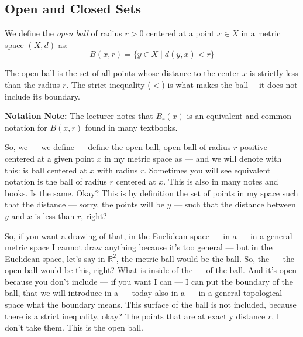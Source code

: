 \subsection{Open and Closed Sets}

\begin{math-stroke}
\setcounter{theorem}{37}
\begin{definition}\label{def:open-ball}
We define the \emph{open ball} of radius $r > 0$ centered at a point $x \in X$ in a metric space $(X, d)$ as:
\[ B(x, r) = \{ y \in X \mid d(y, x) < r \} \]
\end{definition}

\begin{explanation-of-steps}
The open ball is the set of all points whose distance to the center $x$ is strictly less than the radius $r$. The strict inequality ($<$) is what makes the ball —it does not include its boundary.
\end{explanation-of-steps}

\textbf{Notation Note:} The lecturer notes that $B_r(x)$ is an equivalent and common notation for $B(x, r)$ found in many textbooks.
\end{math-stroke}

\begin{spoken-clean}[00:03:13 - 00:05:12]
So, we --- we define --- define the open ball, open ball of radius $r$ positive centered at a given point $x$ in my metric space as --- and we will denote with this: is ball centered at $x$ with radius $r$. Sometimes you will see equivalent notation is the ball of radius $r$ centered at $x$. This is also in many notes and books. Is the same. Okay? This is by definition the set of points in my space such that the distance --- sorry, the points will be $y$ --- such that the distance between $y$ and $x$ is less than $r$, right?

So, if you want a drawing of that, in the Euclidean space --- in a --- in a general metric space I cannot draw anything because it's too general --- but in the Euclidean space, let's say in $\mathbb{R}^2$, the metric ball would be the ball. So, the --- the open ball would be this, right?  What is inside of the --- of the ball. And it's open because you don't include --- if you want I can --- I can put the boundary of the ball, that we will introduce in a --- today also in a --- in a general topological space what the boundary means. This surface of the ball is not included, because there is a strict inequality, okay? The points that are at exactly distance $r$, I don't take them. This is the open ball.
\end{spoken-clean}

